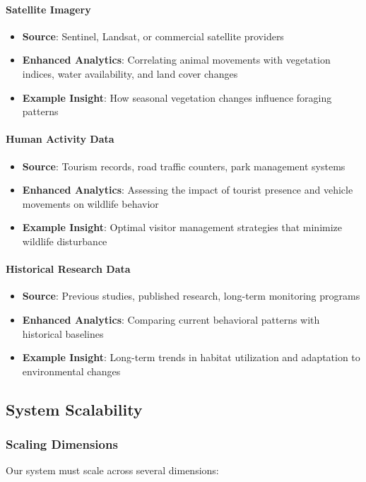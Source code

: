 \paragraph{Satellite Imagery}
\begin{itemize}
  \item \textbf{Source}: Sentinel, Landsat, or commercial satellite providers
  \item \textbf{Enhanced Analytics}: Correlating animal movements with vegetation indices, water availability, and land cover changes
  \item \textbf{Example Insight}: How seasonal vegetation changes influence foraging patterns
\end{itemize}

\paragraph{Human Activity Data}
\begin{itemize}
  \item \textbf{Source}: Tourism records, road traffic counters, park management systems
  \item \textbf{Enhanced Analytics}: Assessing the impact of tourist presence and vehicle movements on wildlife behavior
  \item \textbf{Example Insight}: Optimal visitor management strategies that minimize wildlife disturbance
\end{itemize}

\paragraph{Historical Research Data}
\begin{itemize}
  \item \textbf{Source}: Previous studies, published research, long-term monitoring programs
  \item \textbf{Enhanced Analytics}: Comparing current behavioral patterns with historical baselines
  \item \textbf{Example Insight}: Long-term trends in habitat utilization and adaptation to environmental changes
\end{itemize}

\subsection{System Scalability}

\subsubsection{Scaling Dimensions}
Our system must scale across several dimensions:

